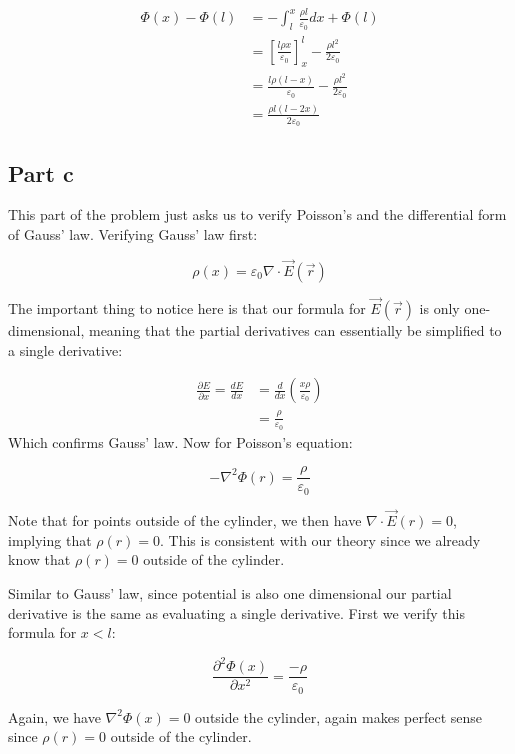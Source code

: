 \documentclass{article}
\theoremstyle{definition}
\numberwithin{equation}{section}
\numberwithin{definition}{section}
\begin{document}
    \begin{align*}
        \Phi(x) - \Phi(l) &= -\int_l^x \frac{\rho l}{\varepsilon_0} dx + \Phi(l)\\
        &= \left[\frac{l\rho x}{\varepsilon_0}\right]_x^l - \frac{\rho l^2}{2\varepsilon_0}\\
        &= \frac{l\rho (l-x)}{\varepsilon_0} - \frac{\rho l^2}{2\varepsilon_0}\\
        &= \frac{\rho l (l - 2x)}{2\varepsilon_0}
    \end{align*}



    \subsection{Part c}

    This part of the problem just asks us to verify Poisson's and the differential form of Gauss' law. Verifying Gauss' law first:

    \[\rho(x) = \varepsilon_0 \nabla \cdot \vec{E}(\vec{r})\]

    The important thing to notice here is that our formula for $\vec{E}(\vec{r})$ is only one-dimensional, meaning that the partial derivatives can essentially be simplified to a single derivative:

    \begin{align*}
        \frac{\partial E}{\partial x} = \frac{dE}{dx} &= \frac{d}{dx}\left(\frac{x\rho}{\varepsilon_0}\right)\\
        &=\frac{\rho}{\varepsilon_0}
    \end{align*}
    Which confirms Gauss' law. Now for Poisson's equation: 

    \[ -\nabla^2 \Phi(r) = \frac{\rho}{\varepsilon_0}\]

    Note that for points outside of the cylinder, we then have $\nabla \cdot \vec{E}(r) = 0$, implying that $\rho(r) = 0$. This is consistent with our theory since we already know that $\rho(r) = 0$ outside of the cylinder.

    \medskip

    Similar to Gauss' law, since potential is also one dimensional our partial derivative is the same as evaluating a single derivative. First we verify this formula for $x < l$:

    \[\frac{\partial^2 \Phi(x)}{\partial x^2} = \frac{-\rho}{\varepsilon_0}\]

    Again, we have $\nabla^2 \Phi(x) = 0$ outside the cylinder, again makes perfect sense since $\rho(r) = 0$ outside of the cylinder.
\end{document}
